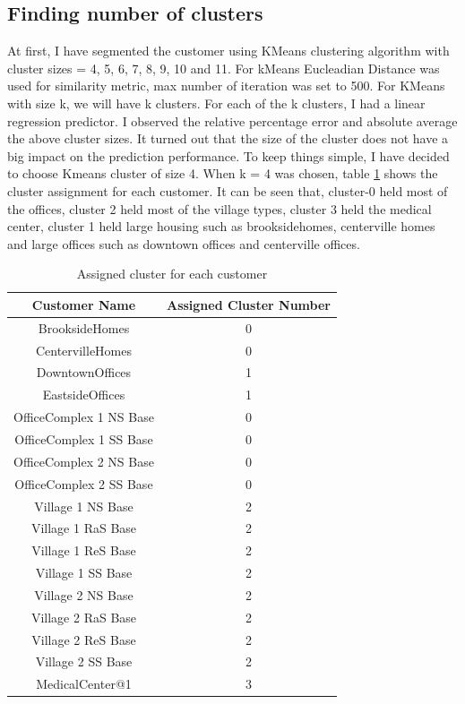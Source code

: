 
\subsection{Finding number of clusters}

At first, I have segmented the customer using KMeans clustering algorithm with cluster sizes = 4, 5, 6, 7, 8, 9, 10 and 11. For kMeans Eucleadian Distance \cite{witten2005data} was used for similarity metric, max number of iteration \cite{witten2005data} was set to 500. For KMeans with size k, we will have k clusters. For each of the k clusters, I had a linear regression predictor. I observed the relative percentage error and absolute average the above cluster sizes. It turned out that the size of the cluster does not have a big impact on the prediction performance. To keep things simple, I have decided to choose Kmeans cluster of size 4. When k = 4 was chosen, table \ref{table:clusterAss} shows the cluster assignment for each customer. It can be seen that, cluster-0 held most of the offices, cluster 2 held most of the village types, cluster 3 held the medical center, cluster 1 held large housing such as brooksidehomes, centerville homes and large offices such as downtown offices and centerville offices.


\begin{table}[h!]
\centering
\caption{Assigned cluster for each customer}
\begin{tabular}{|c| c|} 
 \hline
 Customer Name & Assigned Cluster Number \\ [0.5ex] 
 \hline
BrooksideHomes &	0 \\
CentervilleHomes & 0 \\
DowntownOffices & 1	\\
EastsideOffices &	1 \\
OfficeComplex 1 NS Base &	0 \\
OfficeComplex 1 SS Base &	0 \\
OfficeComplex 2 NS Base &	0 \\
OfficeComplex 2 SS Base &	0 \\
Village 1 NS Base &	2 \\
Village 1 RaS Base &	2 \\
Village 1 ReS Base &	2 \\
Village 1 SS Base &	2 \\
Village 2 NS Base &	2 \\
Village 2 RaS Base &	2 \\
Village 2 ReS Base &	2 \\
Village 2 SS Base &	2 \\
MedicalCenter@1	& 3 \\ [1ex] 
 \hline
\end{tabular}
\label{table:clusterAss}
\end{table}

